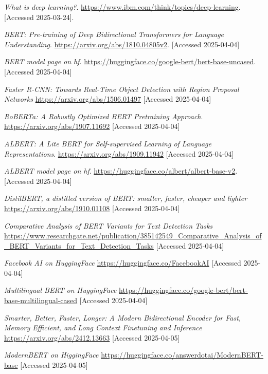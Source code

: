 \documentclass[licencjacka,en]{pracamgr}
\begin{document}
\begin{thebibliography}{199}
\textit{What is deep learning?}.
\url{https://www.ibm.com/think/topics/deep-learning}.
[Accessed 2025-03-24].

\textit{BERT: Pre-training of Deep Bidirectional Transformers for Language Understanding}.
\url{https://arxiv.org/abs/1810.04805v2}.
[Accessed 2025-04-04]

\textit{BERT model page on hf}.
\url{https://huggingface.co/google-bert/bert-base-uncased}.
[Accessed 2025-04-04]

\textit{Faster R-CNN: Towards Real-Time Object Detection with Region Proposal Networks}
\url{https://arxiv.org/abs/1506.01497}
[Accessed 2025-04-04]

\textit{RoBERTa: A Robustly Optimized BERT Pretraining Approach}.
\url{https://arxiv.org/abs/1907.11692}
[Accessed 2025-04-04]

\textit{ALBERT: A Lite BERT for Self-supervised Learning of Language Representations}.
\url{https://arxiv.org/abs/1909.11942}
[Accessed 2025-04-04]

\textit{ALBERT model page on hf}.
\url{https://huggingface.co/albert/albert-base-v2}.
[Accessed 2025-04-04]

\textit{DistilBERT, a distilled version of BERT: smaller, faster, cheaper and lighter}
\url{https://arxiv.org/abs/1910.01108}
[Accessed 2025-04-04]

\textit{Comparative Analysis of BERT Variants for Text Detection Tasks}
\url{https://www.researchgate.net/publication/385142549_Comparative_Analysis_of_BERT_Variants_for_Text_Detection_Tasks}
[Accessed 2025-04-04]

\textit{Facebook AI on HuggingFace}
\url{https://huggingface.co/FacebookAI}
[Accessed 2025-04-04]

\textit{Multilingual BERT on HuggingFace}
\url{https://huggingface.co/google-bert/bert-base-multilingual-cased}
[Accessed 2025-04-04]

\textit{Smarter, Better, Faster, Longer: A Modern Bidirectional Encoder for Fast, Memory Efficient, and Long Context Finetuning and Inference}
\url{https://arxiv.org/abs/2412.13663}
[Accessed 2025-04-05]

\textit{ModernBERT on HiggingFace}
\url{https://huggingface.co/answerdotai/ModernBERT-base}
[Accessed 2025-04-05]


\end{thebibliography}
\end{document}
